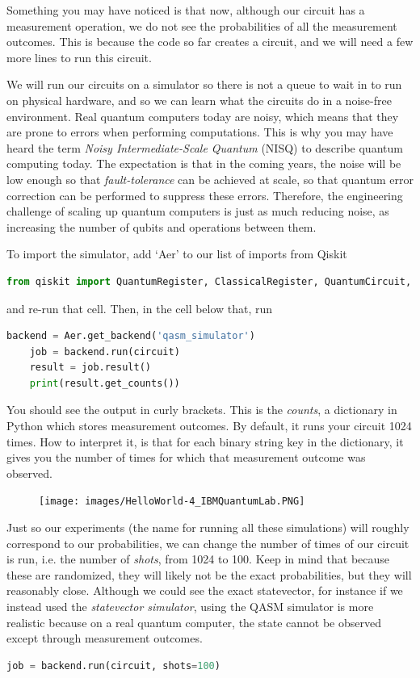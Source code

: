 \documentclass{article}
\theoremstyle{definition}
\begin{document}
Something you may have noticed is that now, although our circuit has a measurement operation, we do not see the probabilities of all the measurement outcomes.  This is because the code so far creates a circuit, and we will need a few more lines to run this circuit.

We will run our circuits on a simulator so there is not a queue to wait in to run on physical hardware, and so we can learn what the circuits do in a noise-free environment.  Real quantum computers today are noisy, which means that they are prone to errors when performing computations.  This is why you may have heard the term \textit{Noisy Intermediate-Scale Quantum} (NISQ) to describe quantum computing today.  The expectation is that in the coming years, the noise will be low enough so that \textit{fault-tolerance} can be achieved at scale, so that quantum error correction can be performed to suppress these errors.  Therefore, the engineering challenge of scaling up quantum computers is just as much reducing noise, as increasing the number of qubits and operations between them.

To import the simulator, add `Aer' to our list of imports from Qiskit
\begin{lstlisting}[language=Python]
	from qiskit import QuantumRegister, ClassicalRegister, QuantumCircuit, Aer
\end{lstlisting}
and re-run that cell.  Then, in the cell below that, run
\begin{lstlisting}[language=Python]
	backend = Aer.get_backend('qasm_simulator')
	job = backend.run(circuit)
	result = job.result()
	print(result.get_counts())
\end{lstlisting}

You should see the output in curly brackets.  This is the \textit{counts}, a dictionary in Python which stores measurement outcomes.  By default, it runs your circuit 1024 times.  How to interpret it, is that for each binary string key in the dictionary, it gives you the number of times for which that measurement outcome was observed.
\begin{figure}[H]
	\texttt{[image: images/HelloWorld-4\_IBMQuantumLab.PNG]}
\end{figure}

Just so our experiments (the name for running all these simulations) will roughly correspond to our probabilities, we can change the number of times of our circuit is run, i.e. the number of \textit{shots}, from 1024 to 100.  Keep in mind that because these are randomized, they will likely not be the exact probabilities, but they will reasonably close.  Although we could see the exact statevector, for instance if we instead used the \textit{statevector simulator}, using the QASM simulator is more realistic because on a real quantum computer, the state cannot be observed except through measurement outcomes.
\begin{lstlisting}[language=Python]
	job = backend.run(circuit, shots=100)
\end{lstlisting}
\end{document}
